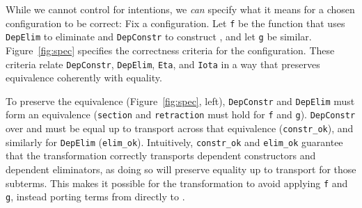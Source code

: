 While we cannot control for intentions, we \textit{can} specify what it means for a chosen configuration to be correct:
Fix a configuration. Let \lstinline{f} be the function that uses \lstinline{DepElim} to eliminate \A and \lstinline{DepConstr} to construct \B,
and let \lstinline{g} be similar. %
Figure~\ref{fig:spec} specifies the correctness criteria for the configuration.
These criteria relate \lstinline{DepConstr}, \lstinline{DepElim}, \lstinline{Eta}, and \lstinline{Iota}
in a way that preserves equivalence coherently with equality.

To preserve the equivalence (Figure~\ref{fig:spec}, left), \lstinline{DepConstr} and \lstinline{DepElim} must form an equivalence
(\lstinline{section} and \lstinline{retraction} must hold for \lstinline{f} and \lstinline{g}).
\lstinline{DepConstr} over \A and \B must be equal up to transport across that equivalence (\lstinline{constr_ok}), 
and similarly for \lstinline{DepElim} (\lstinline{elim_ok}).
Intuitively, \lstinline{constr_ok} and \lstinline{elim_ok} guarantee that the transformation
correctly transports dependent constructors and dependent eliminators,
as doing so will preserve equality up to transport for those subterms.
This makes it possible for the transformation
to avoid applying \lstinline{f} and \lstinline{g}, instead porting terms from \A directly to \B.


